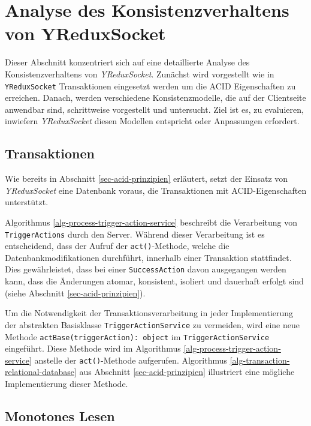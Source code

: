 \documentclass[12pt]{book}          %
\begin{document}
\section{Analyse des Konsistenzverhaltens von YReduxSocket}
\label{sec-konsistenzverhalten}

Dieser Abschnitt konzentriert sich auf eine detaillierte Analyse des Konsistenzverhaltens von \textit{YReduxSocket}. Zunächst wird vorgestellt wie in \texttt{YReduxSocket} Transaktionen eingesetzt werden um die ACID Eigenschaften zu erreichen. Danach, werden verschiedene Konsistenzmodelle, die auf der Clientseite anwendbar sind, schrittweise vorgestellt und untersucht. Ziel ist es, zu evaluieren, inwiefern \textit{YReduxSocket} diesen Modellen entspricht oder Anpassungen erfordert.

\subsection{Transaktionen}
\label{subsec-transactions-yredux-socket}

Wie bereits in Abschnitt \ref{sec-acid-prinzipien} erläutert, setzt der Einsatz von \textit{YReduxSocket} eine Datenbank voraus, die Transaktionen mit ACID-Eigenschaften unterstützt.

Algorithmus \ref{alg-process-trigger-action-service} beschreibt die Verarbeitung von \texttt{TriggerActions} durch den Server. Während dieser Verarbeitung ist es entscheidend, dass der Aufruf der \texttt{act()}-Methode, welche die Datenbankmodifikationen durchführt, innerhalb einer Transaktion stattfindet. Dies gewährleistet, dass bei einer \texttt{SuccessAction} davon ausgegangen werden kann, dass die Änderungen atomar, konsistent, isoliert und dauerhaft erfolgt sind (siehe Abschnitt \ref{sec-acid-prinzipien}).

Um die Notwendigkeit der Transaktionsverarbeitung in jeder Implementierung der abstrakten Basisklasse \texttt{TriggerActionService} zu vermeiden, wird eine neue Methode \texttt{actBase(triggerAction): object} im \texttt{TriggerActionService} eingeführt. Diese Methode wird im Algorithmus \ref{alg-process-trigger-action-service} anstelle der \texttt{act()}-Methode aufgerufen. Algorithmus \ref{alg-transaction-relational-database} aus Abschnitt \ref{sec-acid-prinzipien} illustriert eine mögliche Implementierung dieser Methode.


\subsection{Monotones Lesen}
\label{subsec-monotones-lesen}
\end{document}
